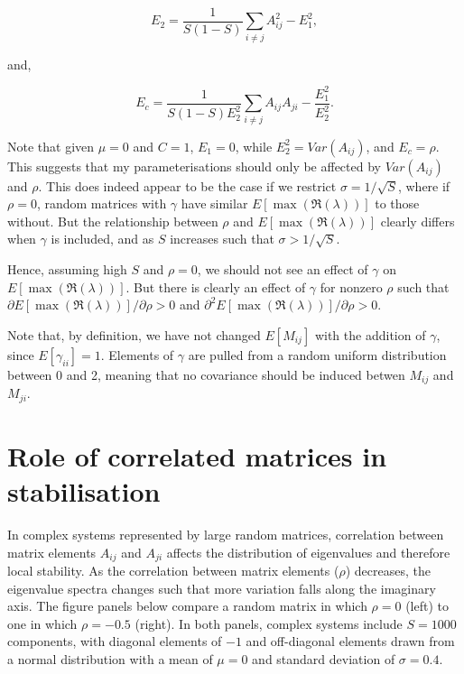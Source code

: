 \documentclass[]{article}
\begin{document}
\[E_{2} = \frac{1}{S(1-S)}\sum_{i \neq j}A^{2}_{ij} - E^{2}_{1},\]

and,

\[E_{c} = \frac{1}{S(1-S)E^{2}_{2}}\sum_{i \neq j} A_{ij} A_{ji} - \frac{E^{2}_{1}}{E^{2}_{2}}.\]

Note that given \(\mu = 0\) and \(C = 1\), \(E_{1} = 0\), while
\(E^{2}_{2} = Var(A_{ij})\), and \(E_{c} = \rho\). This suggests that my
parameterisations should only be affected by \(Var(A_{ij})\) and
\(\rho\). This does indeed appear to be the case if we restrict
\(\sigma = 1/\sqrt{S}\), where if \(\rho = 0\), random matrices with
\(\gamma\) have similar \(E[\max(\Re(\lambda))]\) to those without. But
the relationship between \(\rho\) and \(E[\max(\Re(\lambda))]\) clearly
differs when \(\gamma\) is included, and as \(S\) increases such that
\(\sigma > 1/\sqrt{S}\).

Hence, assuming high \(S\) and \(\rho = 0\), we should not see an effect
of \(\gamma\) on \(E[\max(\Re(\lambda))]\). But there is clearly an
effect of \(\gamma\) for nonzero \(\rho\) such that
\(\partial E[\max(\Re(\lambda))] / \partial\rho > 0\) and
\(\partial^{2} E[\max(\Re(\lambda))] / \partial\rho > 0\).

Note that, by definition, we have not changed \(E[M_{ij}]\) with the
addition of \(\gamma\), since \(E[\gamma_{ii}] = 1\). Elements of
\(\gamma\) are pulled from a random uniform distribution between 0 and
2, meaning that no covariance should be induced betwen \(M_{ij}\) and
\(M_{ji}\).

\section{Role of correlated matrices in
stabilisation}\label{role-of-correlated-matrices-in-stabilisation}

In complex systems represented by large random matrices, correlation
between matrix elements \(A_{ij}\) and \(A_{ji}\) affects the
distribution of eigenvalues and therefore local stability. As the
correlation between matrix elements (\(\rho\)) decreases, the eigenvalue
spectra changes such that more variation falls along the imaginary axis.
The figure panels below compare a random matrix in which \(\rho = 0\)
(left) to one in which \(\rho = -0.5\) (right). In both panels, complex
systems include \(S = 1000\) components, with diagonal elements of
\(-1\) and off-diagonal elements drawn from a normal distribution with a
mean of \(\mu = 0\) and standard deviation of \(\sigma = 0.4\).
\end{document}
